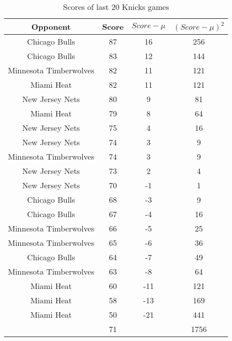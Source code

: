 \documentclass[11pt]{exam}
\begin{document}
\begin{questions}
\newpage


\ifprintanswers
\begin{table}[ht]
\begin{center}
\begin{tabular}{|c|c|c|c|}
  \hline
Opponent & Score & $Score - \mu$ & ${(Score - \mu)}^2$ \\ 
  \hline
Chicago Bulls & 87 & 16 & 256 \\ 
   \hline
Chicago Bulls & 83 & 12 & 144 \\ 
   \hline
Minnesota Timberwolves & 82 & 11 & 121 \\ 
   \hline
Miami Heat & 82 & 11 & 121 \\ 
   \hline
New Jersey Nets & 80 & 9 & 81 \\ 
   \hline
Miami Heat & 79 & 8 & 64 \\ 
   \hline
New Jersey Nets & 75 & 4 & 16 \\ 
   \hline
New Jersey Nets & 74 & 3 & 9 \\ 
   \hline
Minnesota Timberwolves & 74 & 3 & 9 \\ 
   \hline
New Jersey Nets & 73 & 2 & 4 \\ 
   \hline
New Jersey Nets & 70 & -1 & 1 \\ 
   \hline
Chicago Bulls & 68 & -3 & 9 \\ 
   \hline
Chicago Bulls & 67 & -4 & 16 \\ 
   \hline
Minnesota Timberwolves & 66 & -5 & 25 \\ 
   \hline
Minnesota Timberwolves & 65 & -6 & 36 \\ 
   \hline
Chicago Bulls & 64 & -7 & 49 \\ 
   \hline
Minnesota Timberwolves & 63 & -8 & 64 \\ 
   \hline
Miami Heat & 60 & -11 & 121 \\ 
   \hline
Miami Heat & 58 & -13 & 169 \\ 
   \hline
Miami Heat & 50 & -21 & 441 \\ 
   \hline
\hline
 & 71 &  & 1756 \\ 
   \hline
\end{tabular}
\caption{Scores of last 20 Knicks games}
\label{tab:knicks}
\end{center}
\end{table}\else
%
\begin{table}[ht]
\begin{center}

\end{center}
\end{table}
\end{questions}
\end{document}
